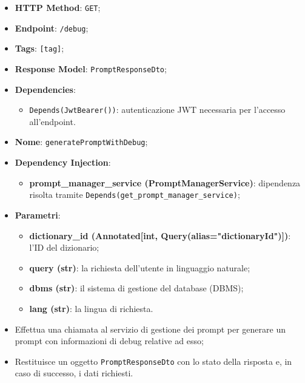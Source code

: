 \begin{itemize}
  \item \textbf{HTTP Method}: \texttt{GET};
  \item \textbf{Endpoint}: \texttt{/debug};
  \item \textbf{Tags}: \texttt{[tag]};
  \item \textbf{Response Model}: \texttt{PromptResponseDto};
  \item \textbf{Dependencies}:
    \begin{itemize}
      \item \texttt{Depends(JwtBearer())}: autenticazione JWT necessaria per l'accesso all'endpoint.
    \end{itemize}
  \item \textbf{Nome}: \texttt{generatePromptWithDebug};
  \item \textbf{Dependency Injection}:
  \begin{itemize}
    \item \textbf{prompt\_manager\_service (PromptManagerService)}: dipendenza risolta tramite \texttt{Depends(get\_prompt\_manager\_service)};
  \end{itemize}
  \item \textbf{Parametri}:
  \begin{itemize}
    \item \textbf{dictionary\_id (Annotated[int, Query(alias="dictionaryId")])}: l'ID del dizionario;
    \item \textbf{query (str)}: la richiesta dell'utente in linguaggio naturale;
    \item \textbf{dbms (str)}: il sistema di gestione del database (DBMS);
    \item \textbf{lang (str)}: la lingua di richiesta.
  \end{itemize}
\end{itemize}

\begin{itemize}
  \item Effettua una chiamata al servizio di gestione dei prompt per generare un prompt con informazioni di debug relative ad esso;
  \item Restituisce un oggetto \texttt{PromptResponseDto} con lo stato della risposta e, in caso di successo, i dati richiesti.
\end{itemize}



